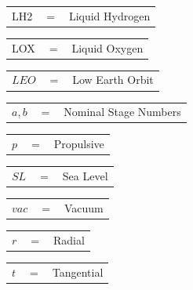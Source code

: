  \begin{tabular}{p{0.8cm}p{0.8cm}p{5.6cm}}
 	LH2 & $=$ & Liquid Hydrogen\\
 \end{tabular} 
\begin{tabular}{p{0.8cm}p{0.8cm}p{5.6cm}}
	LOX & $=$ & Liquid Oxygen\\
\end{tabular} 
\begin{tabular}{p{0.8cm}p{0.8cm}p{5.6cm}}
	$LEO$ & $=$ & Low Earth Orbit\\
\end{tabular}
\begin{tabular}{p{0.8cm}p{0.8cm}p{5.6cm}}
	$a,b$ & $=$ & Nominal Stage Numbers\\
\end{tabular} 
\begin{tabular}{p{0.8cm}p{0.8cm}p{5.6cm}}
	$p$ & $=$ & Propulsive\\
\end{tabular} 
\begin{tabular}{p{0.8cm}p{0.8cm}p{5.6cm}}
	$SL$ & $=$ & Sea Level\\
\end{tabular} 
\begin{tabular}{p{0.8cm}p{0.8cm}p{5.6cm}}
	$vac$ & $=$ & Vacuum\\
\end{tabular} 
\begin{tabular}{p{0.8cm}p{0.8cm}p{5.6cm}}
	$r$ & $=$ & Radial\\
\end{tabular} 
\begin{tabular}{p{0.8cm}p{0.8cm}p{5.6cm}}
	$t$ & $=$ & Tangential\\
\end{tabular} 

